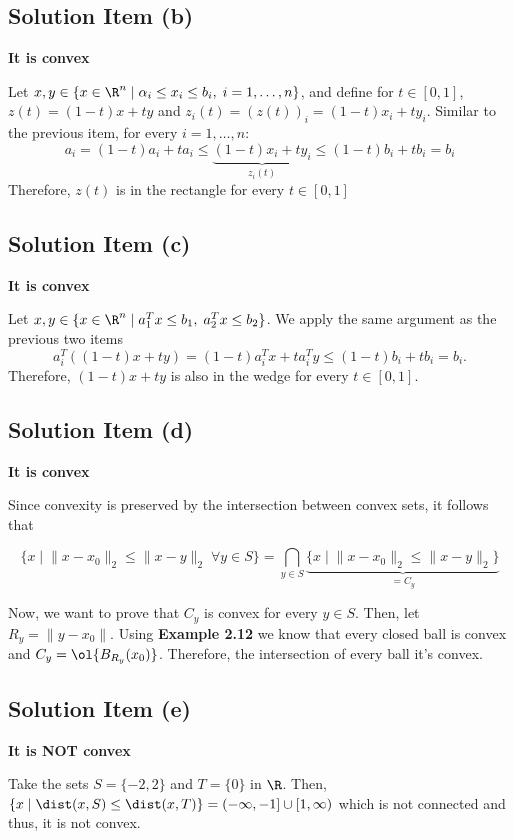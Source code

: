 \subsection*{Solution Item (b)}

\textbf{It is convex}

Let $x,y \in \{x \in \R^n \;|\; \alpha_i \leq x_i \leq b_i,\; i = 1,\ldots, n\}$, and define for $t\in [0,1]$, $z(t) = (1-t)x + t y$ and $z_i(t) = (z(t))_i = (1-t)x_i + t y_i$. Similar to the previous item, for every $i = 1,\ldots, n$:
\[ a_i = (1-t)a_i + ta_i \leq \underbrace{(1-t)x_i + t y_i}_{z_i(t)} \leq (1-t) b_i + t b_i = b_i \]
Therefore, $z(t)$ is in the rectangle for every $t \in [0,1]$

\subsection*{Solution Item (c)}

\textbf{It is convex}

Let $x,y \in \{ x \in \R^{n} \;|\; a_1^T x \leq b_1,\; a_2^T x \leq b_2\}$. We apply the same argument as the previous two items
\[ a_i^T ((1-t)x+ty) = (1-t) a_i^T x + t a_i^T y \leq (1-t) b_i + t b_i = b_i. \]
Therefore, $(1-t)x+ty$ is also in the wedge for every $t\in [0,1]$.

\subsection*{Solution Item (d)}

\textbf{It is convex}

Since convexity is preserved by the intersection between convex sets, it follows that

\[ \{x \;|\; \|x-x_0\|_2 \leq \|x-y\|_2 \; \forall y \in S \} = \bigcap_{y \in S}  \underbrace{\{x \;|\; \|x-x_0\|_2 \leq \|x-y\|_2 \}}_{= C_y}\]

Now, we want to prove that $C_y$ is convex for every $y \in S$. Then, let $R_y = \|y-x_0\|$. Using \textbf{Example 2.12} we know that every closed ball is convex and $C_y = \ol{B_{R_y}(x_0)}$. Therefore, the intersection of every ball it's convex.

\subsection*{Solution Item (e)}

\textbf{It is NOT convex}

Take the sets $S = \{-2,2\}$ and $T = \{0\}$ in $\R$. Then, $\{x \;|\; \dist(x,S) \leq \dist(x,T)\} = (-\infty,-1] \cup [1,\infty)$ which is not connected and thus, it is not convex.

